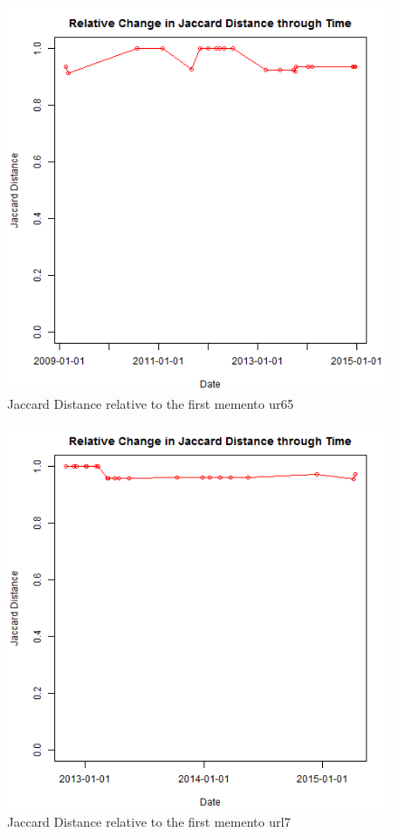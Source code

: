 \begin{figure}[ht]
	\begin{center}
		 \includegraphics[scale=0.60]{url6}
		  \caption{Jaccard Distance relative to the first memento ur65}
	 \end{center}
\end{figure}
\begin{figure}[ht]
	\begin{center}
		 \includegraphics[scale=0.60]{url7}
		  \caption{Jaccard Distance relative to the first memento url7}
	 \end{center}
\end{figure}
